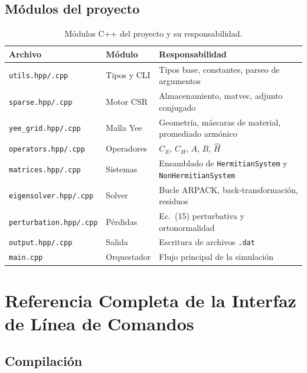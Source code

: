 \documentclass[12pt,a4paper]{article}
\begin{document}
\subsection{Módulos del proyecto}

\begin{table}[htbp]
  \centering
  \caption{Módulos C++ del proyecto y su responsabilidad.}
  \label{tab:modules}
  \begin{tabular}{@{}lll@{}}
    \toprule
    \textbf{Archivo} & \textbf{Módulo} & \textbf{Responsabilidad} \\
    \midrule
    \texttt{utils.hpp/.cpp}       & Tipos y CLI & Tipos base, constantes, parseo de argumentos \\
    \texttt{sparse.hpp/.cpp}      & Motor CSR   & Almacenamiento, matvec, adjunto conjugado \\
    \texttt{yee\_grid.hpp/.cpp}   & Malla Yee   & Geometría, máscaras de material, promediado armónico \\
    \texttt{operators.hpp/.cpp}   & Operadores  & $C_E$, $C_H$, $A$, $B$, $\hat{H}$ \\
    \texttt{matrices.hpp/.cpp}    & Sistemas    & Ensamblado de \texttt{HermitianSystem} y \texttt{NonHermitianSystem} \\
    \texttt{eigensolver.hpp/.cpp} & Solver      & Bucle ARPACK, back-transformación, residuos \\
    \texttt{perturbation.hpp/.cpp}& Pérdidas    & Ec.~(15) perturbativa y ortonormalidad \\
    \texttt{output.hpp/.cpp}      & Salida      & Escritura de archivos \texttt{.dat} \\
    \texttt{main.cpp}             & Orquestador & Flujo principal de la simulación \\
    \bottomrule
  \end{tabular}
\end{table}

\section{Referencia Completa de la Interfaz de Línea de Comandos}

\subsection{Compilación}
\end{document}
